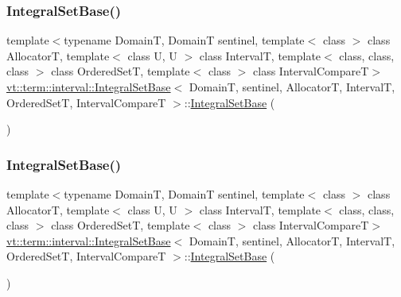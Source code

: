 \subsubsection{\texorpdfstring{Integral\+Set\+Base()}{IntegralSetBase()}\hspace{0.1cm}{\footnotesize\ttfamily [1/4]}}
{\footnotesize\ttfamily template$<$typename DomainT, DomainT sentinel, template$<$ class $>$ class AllocatorT, template$<$ class U, U $>$ class IntervalT, template$<$ class, class, class $>$ class Ordered\+SetT, template$<$ class $>$ class Interval\+CompareT$>$ \\
\hyperlink{structvt_1_1term_1_1interval_1_1_integral_set_base}{vt\+::term\+::interval\+::\+Integral\+Set\+Base}$<$ DomainT, sentinel, AllocatorT, IntervalT, Ordered\+SetT, Interval\+CompareT $>$\+::\hyperlink{structvt_1_1term_1_1interval_1_1_integral_set_base}{Integral\+Set\+Base} (\begin{DoxyParamCaption}{ }\end{DoxyParamCaption})\hspace{0.3cm}{\ttfamily [inline]}}

\mbox{\label{structvt_1_1term_1_1interval_1_1_integral_set_base_a8584b495b7b88baa0eed6012993dd562}} 
\subsubsection{\texorpdfstring{Integral\+Set\+Base()}{IntegralSetBase()}\hspace{0.1cm}{\footnotesize\ttfamily [2/4]}}
{\footnotesize\ttfamily template$<$typename DomainT, DomainT sentinel, template$<$ class $>$ class AllocatorT, template$<$ class U, U $>$ class IntervalT, template$<$ class, class, class $>$ class Ordered\+SetT, template$<$ class $>$ class Interval\+CompareT$>$ \\
\hyperlink{structvt_1_1term_1_1interval_1_1_integral_set_base}{vt\+::term\+::interval\+::\+Integral\+Set\+Base}$<$ DomainT, sentinel, AllocatorT, IntervalT, Ordered\+SetT, Interval\+CompareT $>$\+::\hyperlink{structvt_1_1term_1_1interval_1_1_integral_set_base}{Integral\+Set\+Base} (\begin{DoxyParamCaption}\item[{\hyperlink{structvt_1_1term_1_1interval_1_1_integral_set_base}{Integral\+Set\+Base}$<$ DomainT, sentinel, AllocatorT, IntervalT, Ordered\+SetT, Interval\+CompareT $>$ const \&}]{ }\end{DoxyParamCaption})\hspace{0.3cm}{\ttfamily [default]}}

